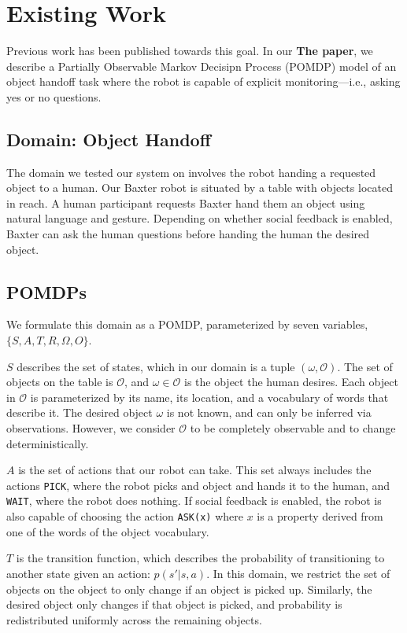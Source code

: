 \documentclass{article}
\begin{document}
\section{Existing Work}

Previous work has been published towards this goal. In our \textbf{The paper}, we describe a Partially Observable Markov Decisipn Process (POMDP) model of an object handoff task where the robot is capable of explicit monitoring---i.e., asking yes or no questions. 
 
\subsection{Domain: Object Handoff}

The domain we tested our system on involves the robot handing a requested object to a human. Our Baxter robot is situated by a table with objects located in reach. A human participant requests Baxter hand them an object using natural language and gesture. Depending on whether social feedback is enabled, Baxter can ask the human questions before handing the human the desired object. 

\subsection{POMDPs}

We formulate this domain as a POMDP, parameterized by seven variables, $\{S,A,T,R, \Omega, O\}$. 

$S$ describes the set of states, which in our domain is a tuple $(\omega, \mathcal{O})$. The set of objects on the table is $\mathcal{O}$, and $\omega \in \mathcal{O}$ is the object the human desires. Each object in $\mathcal{O}$ is parameterized by its name, its location, and a vocabulary of words that describe it. The desired object $\omega$ is not known, and can only be inferred via observations. However, we consider $\mathcal{O}$ to be completely observable and to change deterministically. 

$A$ is the set of actions that our robot can take. This set always includes the actions \texttt{PICK}, where the robot picks and object and hands it to the human, and \texttt{WAIT}, where the robot does nothing. If social feedback is enabled, the robot is also capable of choosing the action \texttt{ASK(x)} where $x$ is a property derived from one of the words of the object vocabulary. 

$T$ is the transition function, which describes the probability of transitioning to another state given an action: $p(s'|s, a)$. In this domain, we restrict the set of objects on the object to only change if an object is picked up. Similarly, the desired object only changes if that object is picked, and probability is redistributed uniformly across the remaining objects. 
\end{document}
